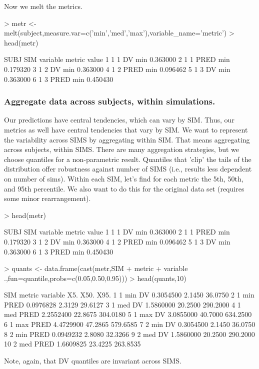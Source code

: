 Now we melt the metrics.
\begin{Schunk}
\begin{Sinput}
> metr <- melt(subject,measure.var=c('min','med','max'),variable_name='metric')
> head(metr)
\end{Sinput}
\begin{Soutput}
  SUBJ SIM variable metric    value
1    1   1       DV    min 0.363000
2    1   1     PRED    min 0.179320
3    1   2       DV    min 0.363000
4    1   2     PRED    min 0.096462
5    1   3       DV    min 0.363000
6    1   3     PRED    min 0.450430
\end{Soutput}
\end{Schunk}
\subsubsection{Aggregate data across subjects, within simulations.}
Our predictions have central tendencies, which can vary by SIM.
Thus, our metrics as well have central tendencies that vary by SIM.
We want to represent the variability across SIMS by aggregating within SIM.
That means aggregating across subjects, within SIMS.  
There are many aggregation strategies, but we choose quantiles for a non-parametric 
result. Quantiles that 'clip' the tails of the distribution offer robustness against
number of SIMS (i.e., results less dependent on number of sims).  
Within each SIM, let's find for each metric the 5th, 50th, and 95th percentile.
We also want to do this for the original data set (requires some minor rearrangement).
\begin{Schunk}
\begin{Sinput}
> head(metr)
\end{Sinput}
\begin{Soutput}
  SUBJ SIM variable metric    value
1    1   1       DV    min 0.363000
2    1   1     PRED    min 0.179320
3    1   2       DV    min 0.363000
4    1   2     PRED    min 0.096462
5    1   3       DV    min 0.363000
6    1   3     PRED    min 0.450430
\end{Soutput}
\begin{Sinput}
> quants <- data.frame(cast(metr,SIM + metric + variable ~ .,fun=quantile,probs=c(0.05,0.50,0.95)))
> head(quants,10)
\end{Sinput}
\begin{Soutput}
   SIM metric variable       X5.    X50.     X95.
1    1    min       DV 0.3054500  2.1450  36.0750
2    1    min     PRED 0.0976828  2.3129  29.6127
3    1    med       DV 1.5860000 20.2500 290.2000
4    1    med     PRED 2.2552400 22.8675 304.0180
5    1    max       DV 3.0855000 40.7000 634.2500
6    1    max     PRED 4.4729900 47.2865 579.6585
7    2    min       DV 0.3054500  2.1450  36.0750
8    2    min     PRED 0.0949232  2.8080  32.3266
9    2    med       DV 1.5860000 20.2500 290.2000
10   2    med     PRED 1.6609825 23.4225 263.8535
\end{Soutput}
\end{Schunk}
Note, again, that DV quantiles are invariant across SIMS.
